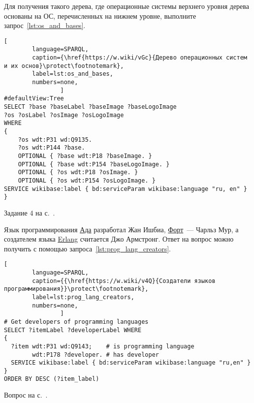\newpage
\begin{task}
\label{answer:os_and_bases}
Для получения такого дерева, где операционные системы верхнего уровня дерева  
основаны на ОС, перечисленных на нижнем уровне, выполните запрос~\ref{lst:os_and_bases}.

\begin{lstlisting}[ 
        language=SPARQL, 
        caption={\href{https://w.wiki/vGc}{Дерево операционных систем и их основ}\protect\footnotemark},
        label=lst:os_and_bases,
        numbers=none,
	            ]
#defaultView:Tree
SELECT ?base ?baseLabel ?baseImage ?baseLogoImage
?os ?osLabel ?osImage ?osLogoImage
WHERE
{
	?os wdt:P31 wd:Q9135.
	?os wdt:P144 ?base.
	OPTIONAL { ?base wdt:P18 ?baseImage. }
	OPTIONAL { ?base wdt:P154 ?baseLogoImage. }
	OPTIONAL { ?os wdt:P18 ?osImage. }
	OPTIONAL { ?os wdt:P154 ?osLogoImage. }
SERVICE wikibase:label { bd:serviceParam wikibase:language "ru, en" }
}
\end{lstlisting}

\small{\AnswerBackref Задание 4 на с.~\pageref{tasks:operating_system_tasks}.}
\end{task}




\hfil{}\hfil%
\newpage

\begin{task}
\label{answer:prog_lang_1}
Язык программирования \href{https://ru.wikipedia.org/wiki/Ада_(язык_программирования)}{Ада} 
    разработал Жан Ишбиа, 
    \href{https://ru.wikipedia.org/wiki/Форт_(язык_программирования)}{Форт}~--- Чарльз Мур, 
    а создателем языка \href{https://ru.wikipedia.org/wiki/Erlang}{Erlang} считается Джо Армстронг. 
    Ответ на вопрос можно получить с помощью запроса~\ref{lst:prog_lang_creators}. 

\begin{lstlisting}[
        language=SPARQL, 
        caption={{\href{https://w.wiki/v4Q}{Создатели языков программирования}}\protect\footnotemark}, 
        label=lst:prog_lang_creators,
        numbers=none,
                ]
# Get developers of programming languages
SELECT ?itemLabel ?developerLabel WHERE 
{
  ?item wdt:P31 wd:Q9143;    # is programming language
        wdt:P178 ?developer. # has developer
  SERVICE wikibase:label { bd:serviceParam wikibase:language "ru,en" }
}
ORDER BY DESC (?item_label)
\end{lstlisting}

\small{\AnswerBackref Вопрос на с.~\pageref{question:prog_lang_1}.}
\end{task}



